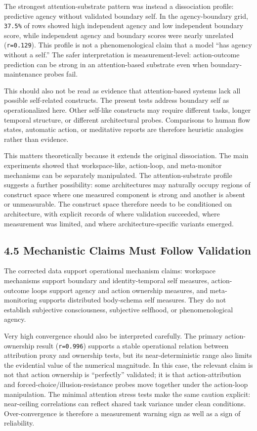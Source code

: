 \documentclass[
  11pt,
  letterpaper,
]{article}
\begin{document}
The strongest attention-substrate pattern was instead a dissociation
profile: predictive agency without validated boundary self. In the
agency-boundary grid, \texttt{37.5\%} of rows showed high independent
agency and low independent boundary score, while independent agency and
boundary scores were nearly unrelated (\texttt{r=0.129}). This profile
is not a phenomenological claim that a model ``has agency without a
self.'' The safer interpretation is measurement-level: action-outcome
prediction can be strong in an attention-based substrate even when
boundary-maintenance probes fail.

This should also not be read as evidence that attention-based systems
lack all possible self-related constructs. The present tests address
boundary self as operationalized here. Other self-like constructs may
require different tasks, longer temporal structure, or different
architectural probes. Comparisons to human flow states, automatic
action, or meditative reports are therefore heuristic analogies rather
than evidence.

This matters theoretically because it extends the original dissociation.
The main experiments showed that workspace-like, action-loop, and
meta-monitor mechanisms can be separately manipulated. The
attention-substrate profile suggests a further possibility: some
architectures may naturally occupy regions of construct space where one
measured component is strong and another is absent or unmeasurable. The
construct space therefore needs to be conditioned on architecture, with
explicit records of where validation succeeded, where measurement was
limited, and where architecture-specific variants emerged.

\subsection{4.5 Mechanistic Claims Must Follow
Validation}\label{mechanistic-claims-must-follow-validation}

The corrected data support operational mechanism claims: workspace
mechanisms support boundary and identity-temporal self measures,
action-outcome loops support agency and action ownership measures, and
meta-monitoring supports distributed body-schema self measures. They do
not establish subjective consciousness, subjective selfhood, or
phenomenological agency.

Very high convergence should also be interpreted carefully. The primary
action-ownership result (\texttt{r=0.996}) supports a stable operational
relation between attribution proxy and ownership tests, but its
near-deterministic range also limits the evidential value of the
numerical magnitude. In this case, the relevant claim is not that action
ownership is ``perfectly'' validated; it is that action-attribution and
forced-choice/illusion-resistance probes move together under the
action-loop manipulation. The minimal attention stress tests make the
same caution explicit: near-ceiling correlations can reflect shared task
variance under clean conditions. Over-convergence is therefore a
measurement warning sign as well as a sign of reliability.
\end{document}
